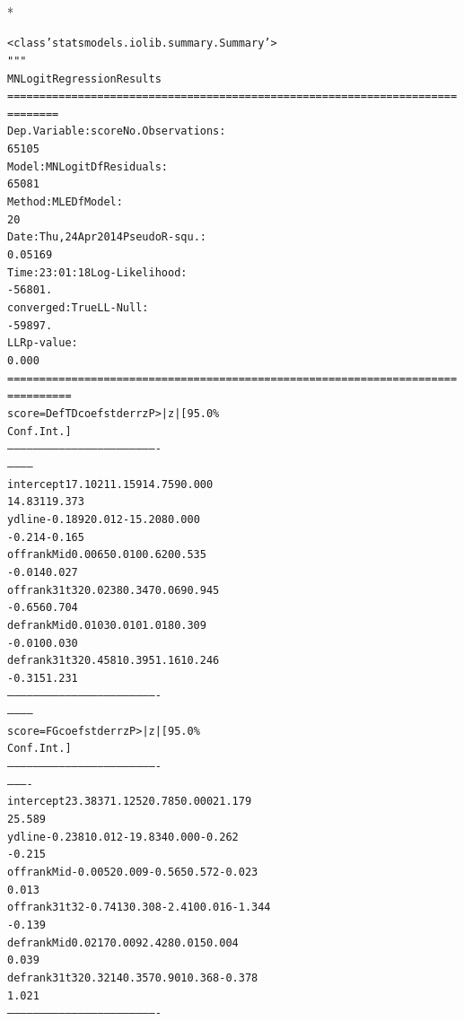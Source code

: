 \documentclass[letterpaper,10pt,english]{/anaconda/lib/python2.7/site-packages/sphinx/texinputs/sphinxhowto}
\def\smaller{\fontsize{9.5pt}{9.5pt}\selectfont}
\newenvironment{InvisibleVerbatim}
        {\begin{mdframed}[leftmargin=0.1\linewidth,innerleftmargin=3pt,innerrightmargin=3pt, userdefinedwidth=1\linewidth, linewidth=0pt, linecolor=white, usetwoside=false]}
        {\end{mdframed}}
\begin{document}
                \makebox[0.1\linewidth]{\smaller\hfill\tt\color{nbframe-out-prompt}Out\hspace{4pt}{[}12{]}:\hspace{4pt}}\\*
                \vspace{-2.55\baselineskip}\begin{InvisibleVerbatim}
                \vspace{-0.5\baselineskip}
\begin{alltt}<class 'statsmodels.iolib.summary.Summary'>
"""
                          MNLogit Regression Results
======================================================================
========
Dep. Variable:                  score   No. Observations:
65105
Model:                        MNLogit   Df Residuals:
65081
Method:                           MLE   Df Model:
20
Date:                Thu, 24 Apr 2014   Pseudo R-squ.:
0.05169
Time:                        23:01:18   Log-Likelihood:
-56801.
converged:                       True   LL-Null:
-59897.
                                        LLR p-value:
0.000
======================================================================
==========
   score=DefTD       coef    std err          z      P>|z|      [95.0\%
Conf. Int.]
----------------------------------------------------------------------
------------
intercept         17.1021      1.159     14.759      0.000
14.831    19.373
ydline            -0.1892      0.012    -15.208      0.000
-0.214    -0.165
offrankMid         0.0065      0.010      0.620      0.535
-0.014     0.027
offrank31t32       0.0238      0.347      0.069      0.945
-0.656     0.704
defrankMid         0.0103      0.010      1.018      0.309
-0.010     0.030
defrank31t32       0.4581      0.395      1.161      0.246
-0.315     1.231
----------------------------------------------------------------------
------------
    score=FG       coef    std err          z      P>|z|      [95.0\%
Conf. Int.]
----------------------------------------------------------------------
----------
intercept       23.3837      1.125     20.785      0.000        21.179
25.589
ydline          -0.2381      0.012    -19.834      0.000        -0.262
-0.215
offrankMid      -0.0052      0.009     -0.565      0.572        -0.023
0.013
offrank31t32    -0.7413      0.308     -2.410      0.016        -1.344
-0.139
defrankMid       0.0217      0.009      2.428      0.015         0.004
0.039
defrank31t32     0.3214      0.357      0.901      0.368        -0.378
1.021
----------------------------------------------------------------------

\end{alltt}
\end{InvisibleVerbatim}
\end{document}
